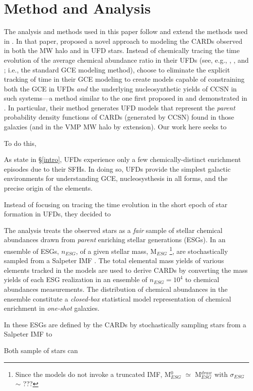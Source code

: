 \section{Method and Analysis}
\label{methods}





The analysis and methods used in this paper follow and extend the methods used in \citet{Lee_2013}. In that paper, \citet{Lee_2013} proposed a novel approach to modeling the CARDs observed in both the MW halo and in UFD stars. Instead of chemically tracing the time evolution of the average chemical abundance ratio in their UFDs (see, e.g., \citet{Cohen_2010}, \citet{?}, and \citet{?}; i.e., the standard GCE modeling method), \citet{Lee_2013} choose to eliminate the explicit tracking of time in their GCE modeling to create models capable of constraining both the GCE in UFDs {\it and} the underlying nucleosynthetic yields of CCSN in such systems---a method similar to the one first proposed in \citet{Karlsson2005a} and demonstrated in \citet{Karlsson2005b}. In particular, their method generates UFD models that represent the {\it parent} probability density functions of CARDs (generated by CCSN) found in those galaxies (and in the VMP MW halo by extension). Our work here seeks to

To do this, 


As state in \S\ref{intro}, UFDs experience only a few chemically-distinct enrichment episodes due to their SFHs. In doing so, UFDs provide the simplest galactic environments for understanding GCE, nucleosysthesis in all forms, and the precise origin of the elements. 


Instead of focusing on tracing the time evolution in the short epoch of star formation in UFDs, they decided to 



The analysis treats the observed stars as a {\it fair} sample of stellar chemical abundances drawn from {\it parent} enriching stellar generations (ESGs). In \citet{Lee_2013} an ensemble of ESGs, $n_{ESG}$, of a given stellar mass, M$_{ESG}$
\footnote{Since the models do not invoke a truncated IMF, M$_{ESG}^0$ $\simeq$ M$_{ESG}^{draw}$ with $\sigma_{ESG}$ $\sim$ ???}, 
are stochastically sampled from a Salpeter IMF \citep{Salpeter_1955}. The total elemental mass yields of various elements tracked in the models are used to derive CARDs by converting the mass yields of each ESG realization in an ensemble of $n_{ESG} = 10^4$ to chemical abundances measurements. The distribution of chemical abundances in the ensemble constitute a {\it closed-box} statistical model representation of chemical enrichment in {\it one-shot} galaxies. 


In \citet{Lee_2013} these ESGs are defined by the CARDs by stochastically sampling stars from a Salpeter IMF \citep{Salpeter_1955} to    

Both sample of stars can 